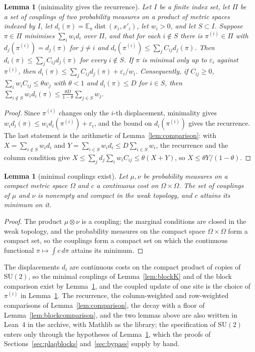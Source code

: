 \documentclass[11pt]{amsart}
\newtheorem{lemma}[theorem]{Lemma}
\theoremstyle{definition}
\theoremstyle{remark}
\numberwithin{equation}{section}
\newcommand{\E}{\mathbb{E}}
\newcommand{\SU}{\mathrm{SU}}
\newcommand{\dist}{\operatorname{dist}}
\begin{document}
\begin{lemma}[minimality gives the recurrence]\label{lem:minimality}
Let $I$ be a finite index set, let $\Pi$ be a set of couplings of two
probability measures on a product of metric spaces indexed by $I$, let
$d_i(\pi)=\E_\pi\dist(x_i,x'_i)$, let $w_i>0$, and let $S\subset I$.
Suppose $\pi\in\Pi$
minimises $\sum_iw_id_i$ over $\Pi$, and that for each $i\notin S$ there
is $\pi^{(i)}\in\Pi$ with $d_j(\pi^{(i)})=d_j(\pi)$ for $j\ne i$ and
$d_i(\pi^{(i)})\le\sum_jC_{ij}d_j(\pi)$. Then $d_i(\pi)\le\sum_jC_{ij}
d_j(\pi)$ for every $i\notin S$. If $\pi$ is minimal only up to
$\varepsilon_i$ against $\pi^{(i)}$, then $d_i(\pi)\le\sum_jC_{ij}d_j(\pi)
+\varepsilon_i/w_i$. Consequently, if $C_{ij}\ge0$, $\sum_iw_iC_{ij}\le
\theta w_j$ with $\theta<1$ and $d_i(\pi)\le D$ for $i\in S$, then
$\sum_{i\notin S}w_id_i(\pi)\le\frac{\theta D}{1-\theta}\sum_{j\in S}w_j$.
\end{lemma}

\begin{proof}
Since $\pi^{(i)}$ changes only the $i$-th displacement, minimality gives
$w_id_i(\pi)\le w_id_i(\pi^{(i)})+\varepsilon_i$, and the bound on
$d_i(\pi^{(i)})$ gives the recurrence. The last statement is the arithmetic
of Lemma~\ref{lem:comparison}: with $X=\sum_{i\notin S}w_id_i$ and $Y=
\sum_{i\in S}w_id_i\le D\sum_{i\in S}w_i$, the recurrence and the column
condition give $X\le\sum_jd_j\sum_iw_iC_{ij}\le\theta(X+Y)$, so $X\le
\theta Y/(1-\theta)$.
\end{proof}

\begin{lemma}[minimal couplings exist]\label{lem:minimiser}
Let $\mu,\nu$ be probability measures on a compact metric space $\Omega$
and $c$ a continuous cost on $\Omega\times\Omega$. The set of couplings of
$\mu$ and $\nu$ is nonempty and compact in the weak topology, and $c$
attains its minimum on it.
\end{lemma}

\begin{proof}
The product $\mu\otimes\nu$ is a coupling; the marginal conditions are
closed in the weak topology, and the probability measures on the compact
space $\Omega\times\Omega$ form a compact set, so the couplings form a
compact set on which the continuous functional $\pi\mapsto\int c\,d\pi$
attains its minimum.
\end{proof}

The displacements $d_i$ are continuous costs on the compact product of
copies of $\SU(2)$, so the minimal couplings of Lemma~\ref{lem:blockK} and
of the block comparison exist by Lemma~\ref{lem:minimiser}, and the
coupled update of one site is the choice of $\pi^{(i)}$ in
Lemma~\ref{lem:minimality}. The recurrence, the column-weighted and
row-weighted comparisons of Lemma~\ref{lem:comparison}, the decay with a
floor of Lemma~\ref{lem:blockcomparison}, and the two lemmas above are
also written in Lean~4 in the archive, with Mathlib as the library; the
specification of $\SU(2)$ enters only through the
hypotheses of Lemma~\ref{lem:minimality}, which the proofs of
Sections~\ref{sec:plaqblocks} and~\ref{sec:bypass} supply by hand.
\end{document}
